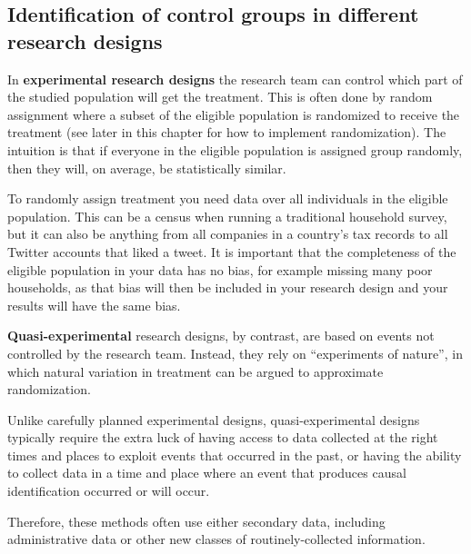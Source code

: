 \subsection{Identification of control groups in different research designs}


In \textbf{experimental research designs} the research team can control which part of the studied population will get the treatment. 
This is often done by random assignment
where a subset of the eligible population is randomized to receive the treatment (see later in this chapter for how to implement randomization). 
The intuition is that if everyone in the eligible population is assigned group randomly, then they will, on average, be statistically similar.

To randomly assign treatment you need data over all individuals in the eligible population. 
This can be a census when running a traditional household survey, 
but it can also be anything from all companies in a country's tax records
to all Twitter accounts that liked a tweet.
It is important that the completeness of the eligible population in your data has no bias, 
for example missing many poor households, 
as that bias will then be included in your research design and your results will have the same bias.



\textbf{Quasi-experimental} research designs,
by contrast, are based on events not controlled by the research team. Instead, they rely on ``experiments of nature'',
in which natural variation in treatment can be argued to approximate randomization. 

Unlike carefully planned experimental designs,
quasi-experimental designs typically require the extra luck
of having access to data collected at the right times and places
to exploit events that occurred in the past,
or having the ability to collect data in a time and place
where an event that produces causal identification occurred or will occur.

Therefore, these methods often use either secondary data,
including administrative data or other new classes of routinely-collected information.


